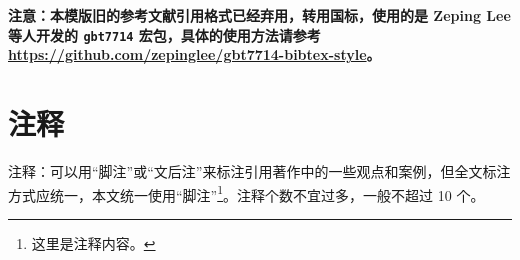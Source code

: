 \textbf{注意：本模版旧的参考文献引用格式已经弃用，转用国标，使用的是 Zeping Lee 等人开发的 \texttt{gbt7714} 宏包，具体的使用方法请参考 \url{https://github.com/zepinglee/gbt7714-bibtex-style}。}

\section{注释}

注释：可以用“脚注”或“文后注”来标注引用著作中的一些观点和案例，但全文标注方式应统一，本文统一使用“脚注”\footnote{这里是注释内容。}。注释个数不宜过多，一般不超过 10 个。
